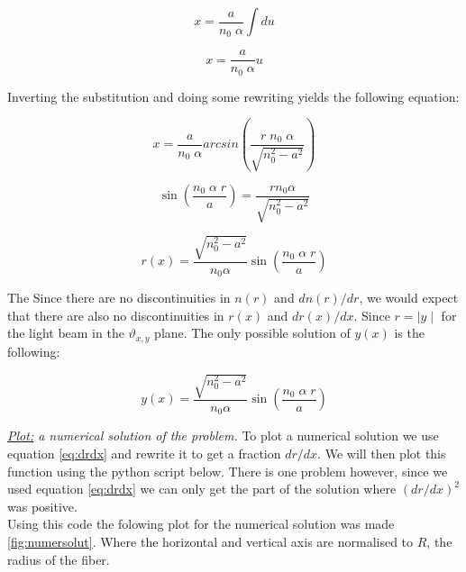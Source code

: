 \documentclass{article}
\begin{document}
\begin{equation}
	x = \frac{a}{n_0 \; \alpha} \int du
\end{equation}

\begin{equation}
	x = \frac{a}{n_0 \; \alpha} u
\end{equation}

Inverting the substitution and doing some rewriting yields the following equation:

\begin{equation}
	x = \frac{a}{n_0 \; \alpha} arcsin \left( \frac{r \; n_0 \; \alpha}{\sqrt{n_0^2-a^2}} \right)
\end{equation}

\begin{equation}
	\sin \left( \frac{n_0 \; \alpha \; r}{a} \right) =  \frac{r n_0 \alpha}{\sqrt{n_0^2-a^2}}
\end{equation}

\begin{equation}
	r(x) = \frac{\sqrt{n_0^2-a^2}}{n_0 \alpha} \sin \left( \frac{n_0 \; \alpha \; r}{a} \right)
\end{equation}

The
Since there are no discontinuities in $n(r)$ and $dn(r)/dr$, we would expect that there are also no discontinuities in $r(x)$ and $dr(x)/dx$. Since $r = \mid y \mid$ for the light beam in the $\vartheta _{x,y}$ plane. The only possible solution of $y(x)$ is the following:

\begin{equation}
	y(x) = \frac{\sqrt{n_0^2-a^2}}{n_0 \alpha} \sin \left( \frac{n_0 \; \alpha \; r}{a}\right)
\end{equation}

\textit{\underline{Plot:} a numerical solution of the problem.}
To plot a numerical solution we use equation \ref{eq:drdx} and rewrite it to get a fraction $dr/dx$. We will then plot this function using the python script below. There is one problem however, since we used equation  \ref{eq:drdx} we can only get the part of the solution where $(dr/dx)^2$ was positive.\\



Using this code the folowing plot for the numerical solution was made \ref{fig:numersolut}. Where the horizontal and vertical axis are normalised to $R$, the radius of the fiber.\\
\end{document}
